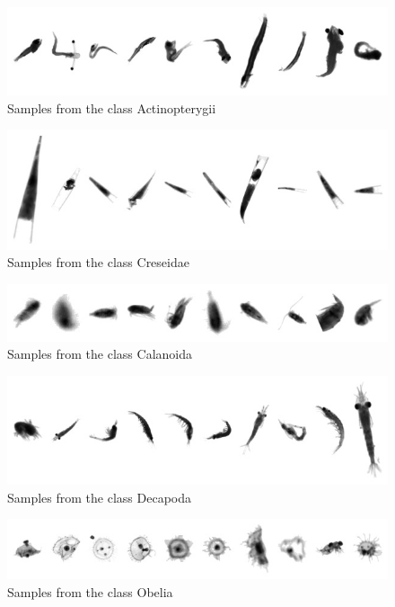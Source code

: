 \begin{figure}[h]
\includegraphics[width=\columnwidth]{collage/034_Actinopterygii.jpg}\caption{Samples from the class Actinopterygii }
\end{figure}
\begin{figure}[h]
\includegraphics[width=\columnwidth]{collage/035_Creseidae.jpg}\caption{Samples from the class Creseidae }
\end{figure}
\begin{figure}[h]
\includegraphics[width=\columnwidth]{collage/036_Calanoida.jpg}\caption{Samples from the class Calanoida }
\end{figure}
\begin{figure}[h]
\includegraphics[width=\columnwidth]{collage/037_Decapoda.jpg}\caption{Samples from the class Decapoda }
\end{figure}
\begin{figure}[h]
\includegraphics[width=\columnwidth]{collage/038_Obelia.jpg}\caption{Samples from the class Obelia }
\end{figure}
